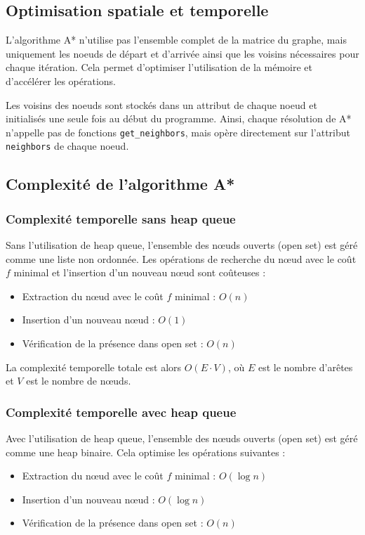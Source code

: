 \subsection{Optimisation spatiale et temporelle}
L'algorithme A* n'utilise pas l'ensemble complet de la matrice du graphe, mais uniquement les noeuds de départ et d'arrivée ainsi que les voisins nécessaires pour chaque itération. Cela permet d'optimiser l'utilisation de la mémoire et d'accélérer les opérations.

Les voisins des noeuds sont stockés dans un attribut de chaque noeud et initialisés une seule fois au début du programme. Ainsi, chaque résolution de A* n'appelle pas de fonctions \texttt{get\_neighbors}, mais opère directement sur l'attribut \texttt{neighbors} de chaque noeud.

\subsection{Complexité de l'algorithme A*}

\subsubsection*{Complexité temporelle sans heap queue}
Sans l'utilisation de heap queue, l'ensemble des nœuds ouverts (open set) est géré comme une liste non ordonnée. Les opérations de recherche du nœud avec le coût \( f \) minimal et l'insertion d'un nouveau nœud sont coûteuses :

\begin{itemize}
    \item Extraction du nœud avec le coût \( f \) minimal : \( O(n) \)
    \item Insertion d'un nouveau nœud : \( O(1) \)
    \item Vérification de la présence dans open set : \( O(n) \)
\end{itemize}

La complexité temporelle totale est alors \( O(E \cdot V) \), où \( E \) est le nombre d'arêtes et \( V \) est le nombre de nœuds.

\subsubsection*{Complexité temporelle avec heap queue}
Avec l'utilisation de heap queue, l'ensemble des nœuds ouverts (open set) est géré comme une heap binaire. Cela optimise les opérations suivantes :

\begin{itemize}
    \item Extraction du nœud avec le coût \( f \) minimal : \( O(\log n) \)
    \item Insertion d'un nouveau nœud : \( O(\log n) \)
    \item Vérification de la présence dans open set : \( O(n) \)
\end{itemize}

